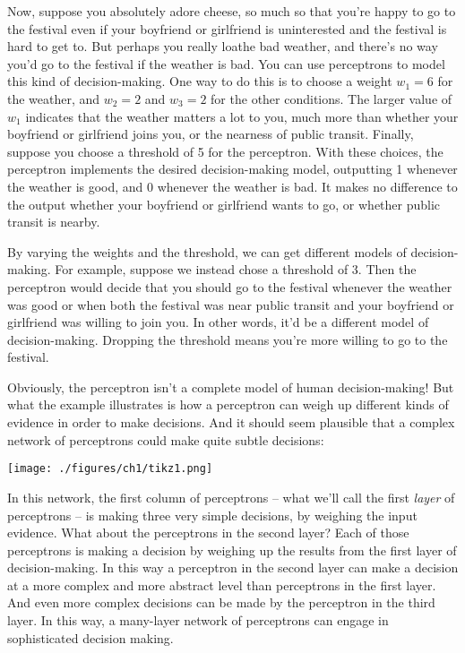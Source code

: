 \documentclass[a4paper,twoside,10pt]{book}
\begin{document}
Now, suppose you absolutely adore cheese, so much so that you're happy to go to the festival even if your boyfriend or girlfriend is uninterested and the festival is hard to get to. But perhaps you really loathe bad weather, and there's no way you'd go to the festival if the weather is bad. You can use perceptrons to model this kind of decision-making. One way to do this is to choose a weight $w_1=6$ for the weather, and $w_2=2$ and $w_3=2$ for the other conditions. The larger value of $w_1$ indicates that the weather matters a lot to you, much more than whether your boyfriend or girlfriend joins you, or the nearness of public transit. Finally, suppose you choose a threshold of 5 for the perceptron. With these choices, the perceptron implements the desired decision-making model, outputting 1 whenever the weather is good, and 0 whenever the weather is bad. It makes no difference to the output whether your boyfriend or girlfriend wants to go, or whether public transit is nearby.

By varying the weights and the threshold, we can get different models of decision-making. For example, suppose we instead chose a threshold of 3. Then the perceptron would decide that you should go to the festival whenever the weather was good or when both the festival was near public transit and your boyfriend or girlfriend was willing to join you. In other words, it'd be a different model of decision-making. Dropping the threshold means you're more willing to go to the festival.

Obviously, the perceptron isn't a complete model of human decision-making! But what the example illustrates is how a perceptron can weigh up different kinds of evidence in order to make decisions. And it should seem plausible that a complex network of perceptrons could make quite subtle decisions:
\begin{center}
	\texttt{[image: ./figures/ch1/tikz1.png]}
\end{center}	
In this network, the first column of perceptrons -- what we'll call the first \textit{layer} of perceptrons -- is making three very simple decisions, by weighing the input evidence. What about the perceptrons in the second layer? Each of those perceptrons is making a decision by weighing up the results from the first layer of decision-making. In this way a perceptron in the second layer can make a decision at a more complex and more abstract level than perceptrons in the first layer. And even more complex decisions can be made by the perceptron in the third layer. In this way, a many-layer network of perceptrons can engage in sophisticated decision making.
\end{document}
